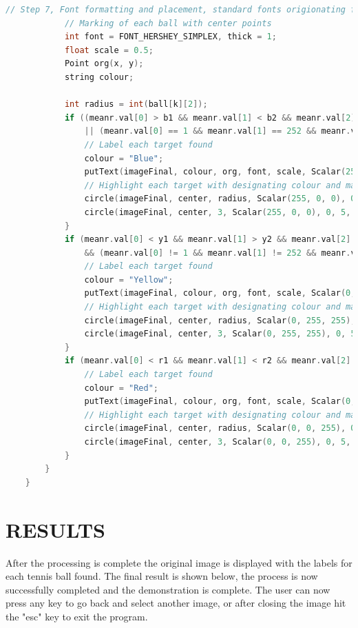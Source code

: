 \documentclass[a4paper, 10pt]{article}
\begin{document}
\begin{lstlisting}[language = C++]
			// Step 7, Font formatting and placement, standard fonts origionating from center point of each ball
			// Marking of each ball with center points
			int font = FONT_HERSHEY_SIMPLEX, thick = 1;
			float scale = 0.5;
			Point org(x, y);
			string colour;

			int radius = int(ball[k][2]);
			if ((meanr.val[0] > b1 && meanr.val[1] < b2 && meanr.val[2] < b3)
				|| (meanr.val[0] == 1 && meanr.val[1] == 252 && meanr.val[2] == 251)) {
				// Label each target found
				colour = "Blue";
				putText(imageFinal, colour, org, font, scale, Scalar(255, 0, 0), thick, 5);
				// Highlight each target with designating colour and mark the center points
				circle(imageFinal, center, radius, Scalar(255, 0, 0), 0, 5, 0);
				circle(imageFinal, center, 3, Scalar(255, 0, 0), 0, 5, 0);
			}
			if (meanr.val[0] < y1 && meanr.val[1] > y2 && meanr.val[2] > y3
				&& (meanr.val[0] != 1 && meanr.val[1] != 252 && meanr.val[2] != 251)) {
				// Label each target found
				colour = "Yellow";
				putText(imageFinal, colour, org, font, scale, Scalar(0, 255, 255), thick, 5);
				// Highlight each target with designating colour and mark the center points
				circle(imageFinal, center, radius, Scalar(0, 255, 255), 0, 5, 0);
				circle(imageFinal, center, 3, Scalar(0, 255, 255), 0, 5, 0);
			}			
			if (meanr.val[0] < r1 && meanr.val[1] < r2 && meanr.val[2] > r3) {
				// Label each target found
				colour = "Red";
				putText(imageFinal, colour, org, font, scale, Scalar(0, 0, 255), thick, 5);
				// Highlight each target with designating colour and mark the center points
				circle(imageFinal, center, radius, Scalar(0, 0, 255), 0, 5, 0);
				circle(imageFinal, center, 3, Scalar(0, 0, 255), 0, 5, 0);
			}
		}
	}

\end{lstlisting}


\clearpage

\section{RESULTS}

After the processing is complete the original image is displayed with the labels for each tennis ball found. The final result is shown below, the process is now successfully completed and the demonstration is complete. The user can now press any key to go back and select another image, or after closing the image hit the "esc" key to exit the program.
\end{document}

